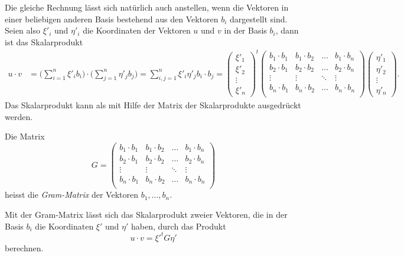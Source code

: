 Die gleiche Rechnung lässt sich natürlich auch anstellen, wenn die
Vektoren in einer beliebigen anderen Basis bestehend aus den Vektoren
$b_i$ dargestellt sind. 
Seien also $\xi'_i$ und $\eta'_i$ die Koordinaten der Vektoren $u$ und $v$
in der Basis $b_i$, dann ist das Skalarprodukt
\begin{align*}
u\cdot v
&=
\biggl(\sum_{i=1}^n \xi'_i b_i\biggr)
\cdot
\biggl(\sum_{j=1}^n \eta'_j b_j\biggr)
=
\sum_{i,j=1}^n \xi'_i\eta'_j b_i\cdot b_j
=
\begin{pmatrix}
\xi'_1\\\xi'_2\\\vdots\\\xi'_n
\end{pmatrix}^t
\begin{pmatrix}
b_1\cdot b_1&b_1\cdot b_2&\dots &b_1\cdot b_n\\
b_2\cdot b_1&b_2\cdot b_2&\dots &b_2\cdot b_n\\
\vdots      &\vdots      &\ddots&\vdots      \\
b_n\cdot b_1&b_n\cdot b_2&\dots &b_n\cdot b_n\\
\end{pmatrix}
\begin{pmatrix}
\eta'_1\\\eta'_2\\\vdots\\\eta'_n
\end{pmatrix}.
\end{align*}
Das Skalarprodukt kann als mit Hilfe der Matrix der Skalarprodukte
ausgedrückt werden.

\begin{definition}
Die Matrix
\[
G
=
\begin{pmatrix}
b_1\cdot b_1&b_1\cdot b_2&\dots &b_1\cdot b_n\\
b_2\cdot b_1&b_2\cdot b_2&\dots &b_2\cdot b_n\\
\vdots      &\vdots      &\ddots&\vdots      \\
b_n\cdot b_1&b_n\cdot b_2&\dots &b_n\cdot b_n\\
\end{pmatrix}
\]
heisst die {\em Gram-Matrix} der Vektoren $b_1,\dots,b_n$.
%
\end{definition}

Mit der Gram-Matrix lässt sich das Skalarprodukt zweier Vektoren,
die in der Basis $b_i$ die Koordinaten $\xi'$ und $\eta'$ haben,
durch das Produkt
\[
u\cdot v
=
\xi'^t G \eta'
\]
berechnen.

